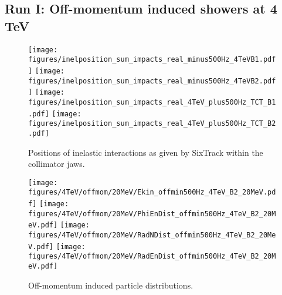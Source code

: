 \subsection{Run I: Off-momentum induced showers at 4 TeV}

\begin{figure}
\begin{center}
\texttt{[image: figures/inelposition\_sum\_impacts\_real\_minus500Hz\_4TeVB1.pdf]}
\texttt{[image: figures/inelposition\_sum\_impacts\_real\_minus500Hz\_4TeVB2.pdf]}
\texttt{[image: figures/inelposition\_sum\_impacts\_real\_4TeV\_plus500Hz\_TCT\_B1.pdf]}
\texttt{[image: figures/inelposition\_sum\_impacts\_real\_4TeV\_plus500Hz\_TCT\_B2.pdf]}
\end{center}
\vspace{-0.6cm}
 \caption{Positions of inelastic interactions as given by SixTrack within the collimator jaws.
  \label{inel4TeVOffmom}}
\end{figure}


\begin{figure}
\begin{center}
  \texttt{[image: figures/4TeV/offmom/20MeV/Ekin\_offmin500Hz\_4TeV\_B2\_20MeV.pdf]}
  \texttt{[image: figures/4TeV/offmom/20MeV/PhiEnDist\_offmin500Hz\_4TeV\_B2\_20MeV.pdf]}
  \texttt{[image: figures/4TeV/offmom/20MeV/RadNDist\_offmin500Hz\_4TeV\_B2\_20MeV.pdf]}
  \texttt{[image: figures/4TeV/offmom/20MeV/RadEnDist\_offmin500Hz\_4TeV\_B2\_20MeV.pdf]}
\end{center}
\vspace{-0.6cm}
 \caption{Off-momentum induced particle distributions.
  \label{offmom4TeV}}
\end{figure}

